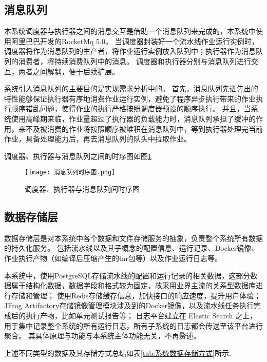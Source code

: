 \subsection{消息队列}

本系统调度器与执行器之间的消息交互是借助一个消息队列来完成的，本系统中使用阿里巴巴开发的RocketMq 5.0。
当调度器封装好一个流水线作业运行实例时，调度器将作为消息队列的生产者，将作业运行实例放入队列中；执行器作为消息队列的消费者，将持续消费队列中的消息。
调度器和执行器分别与消息队列进行交互，两者之间解耦，便于后续扩展。

系统引入消息队列的主要目的是实现需求分析中的。
首先，消息队列先进先出的特性能够保证执行器有序地消费作业运行实例，避免了程序异步执行带来的作业执行顺序错乱问题，使得作业的执行严格按照调度器预设的顺序执行。
并且，当系统使用高峰期来临，作业量超过了执行器的负载能力时，消息队列承担了缓冲的作用，来不及被消费的作业将按照顺序被堆积在消息队列中，等到执行器处理完当前作业，具备处理能力后，再去消息队列的队头中拉取作业。

调度器、执行器与消息队列之间的时序图如图\ref{fig:消息队列时序图}

\begin{figure}[h]
  \centering
  \texttt{[image: 消息队列时序图.png]}
  \caption{调度器、执行器与消息队列间时序图}
  \label{fig:消息队列时序图}
\end{figure}

\subsection{数据存储层}
数据存储层是对本系统中各个数据和文件存储服务的抽象，负责整个系统所有数据的持久化服务。
包括流水线以及其子概念的配置信息、运行记录、Docker镜像、作业执行产物（如编译后压缩产生的tar包等）以及作业运行日志等。


本系统中，使用PostgreSQL存储流水线的配置和运行记录的相关数据，这部分数据属于结构化数据，数据字段和格式较为固定，故采用业界主流的关系型数据库进行存储和管理；
使用Redis存储缓存信息，加快接口的响应速度，提升用户体验；
JFrog Artifactory存储镜像管理模块涉及到的Docker镜像，以及流水线任务执行完成后的执行产物，比如单元测试报告等；
日志平台建立在 Elastic Search 之上，用于集中记录整个系统的所有运行日志，所有子系统的日志都会传送至该平台进行聚合。
其具体原理与功能与本系统主体功能无关，不再赘述。

上述不同类型的数据及其存储方式总结如表\ref{tab:系统数据存储方式}所示.

